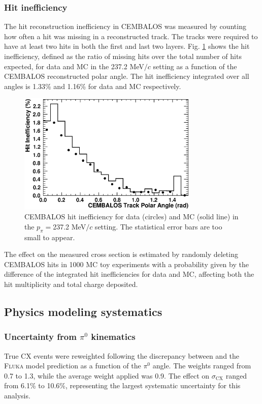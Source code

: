 \subsubsection{\bf Hit inefficiency}
The hit reconstruction inefficiency in CEMBALOS was measured by counting how often a hit was missing in a reconstructed track. The tracks were required to have at least two hits in both the first and last two layers. Fig. \ref{fig:hit_ineff} shows the hit inefficiency, defined as the ratio of missing hits over the total number of hits expected, for data and MC in the 237.2 MeV$/c$ setting as a function of the CEMBALOS reconstructed polar angle. The hit inefficiency integrated over all angles is 1.33\% and 1.16\% for data and MC respectively.
\begin{figure}[ht]
 \includegraphics[width=86mm]{figures/cembalos_hit_ineff_237.eps}
 \caption{CEMBALOS hit inefficiency for data (circles) and MC (solid line) in the $p_\pi=$237.2 MeV$/c$ setting. The statistical error bars are too small to appear.}
 \label{fig:hit_ineff}
\end{figure}

The effect on the measured cross section is estimated by randomly deleting CEMBALOS hits in 1000 MC toy experiments with a probability given by the difference of the integrated hit inefficiencies for data and MC, affecting both the hit multiplicity and total charge deposited.

\subsection{Physics modeling systematics}\label{sec:physics_syst}
\subsubsection{\bf{ Uncertainty from $\pi^{0}$ kinematics }}
True CX events were reweighted following the discrepancy between \cite{Ashery2} and the \textsc{Fluka} model prediction as a function of the $\pi^{0}$ angle. The weights ranged from 0.7 to 1.3, while the average weight applied was 0.9. The effect on $\sigma_{\mathrm{CX}}$ ranged  from 6.1\% to 10.6\%, representing the largest systematic uncertainty for this analysis.

